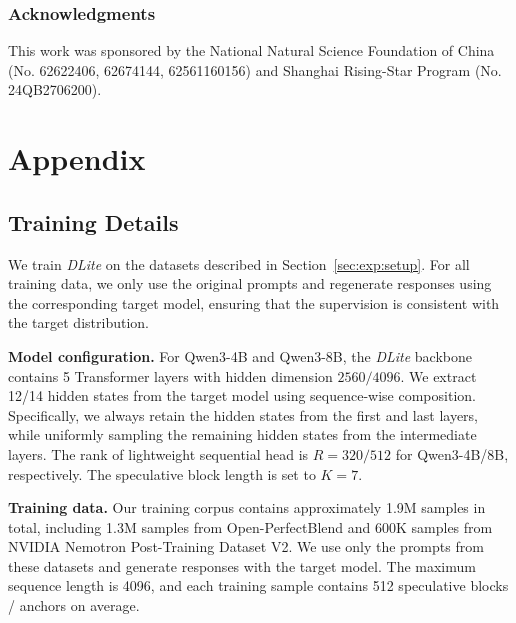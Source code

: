 \documentclass{article} %
\newcommand{\we}{\emph{DLite}\xspace}
\begin{document}

\subsubsection*{Acknowledgments}
This work was sponsored by the National Natural Science Foundation of China (No. 62622406, 62674144, 62561160156) and Shanghai Rising-Star Program (No. 24QB2706200).




\appendix
\section{Appendix}
\subsection{Training Details}

We train \we on the datasets described in Section~\ref{sec:exp:setup}. For all training data, we only use the original prompts and regenerate responses using the corresponding target model, ensuring that the supervision is consistent with the target distribution.

\textbf{Model configuration.} For Qwen3-4B and Qwen3-8B, the \we backbone contains 5 Transformer layers with hidden dimension \(2560/4096\). We extract 12/14 hidden states from the target model using sequence-wise composition. Specifically, we always retain the hidden states from the first and last layers, while uniformly sampling the remaining hidden states from the intermediate layers. The rank of lightweight sequential head is \(R=320/512\) for Qwen3-4B/8B, respectively. The speculative block length is set to \(K=7\).

\textbf{Training data.} Our training corpus contains approximately 1.9M samples in total, including 1.3M samples from Open-PerfectBlend and 600K samples from NVIDIA Nemotron Post-Training Dataset V2. We use only the prompts from these datasets and generate responses with the target model. The maximum sequence length is 4096, and each training sample contains 512 speculative blocks / anchors on average.
\end{document}
